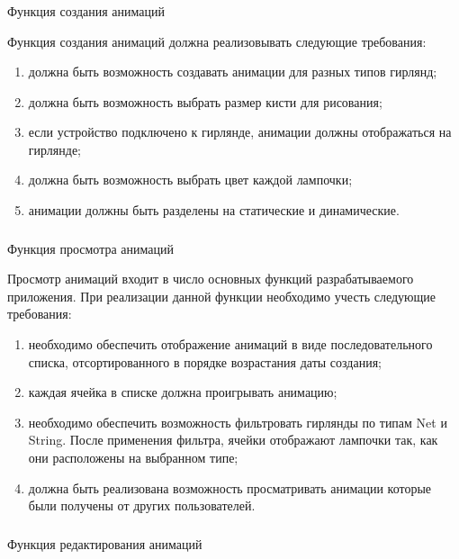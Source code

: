 \subsubsection{} Функция создания анимаций
\label{sec:domain:specification:messages}

Функция создания анимаций должна реализовывать следующие требования:

\begin{enumerate}
	\item должна быть возможность создавать анимации для разных типов гирлянд;
	\item должна быть возможность выбрать размер кисти для рисования;
	\item если устройство подключено к гирлянде, анимации должны отображаться на гирлянде;
	\item должна быть возможность выбрать цвет каждой лампочки;
	\item анимации должны быть разделены на статические и динамические.
\end{enumerate}

\subsubsection{} Функция просмотра анимаций
\label{sec:domain:specification:agenda}

Просмотр анимаций входит в число основных функций разрабатываемого приложения. При реализации данной функции необходимо учесть следующие требования:

\begin{enumerate}
	\item необходимо обеспечить отображение анимаций в виде последовательного списка, отсортированного в порядке возрастания даты создания;
	\item каждая ячейка в списке должна проигрывать анимацию;
	\item необходимо обеспечить возможность фильтровать гирлянды по типам Net и String. После применения фильтра, ячейки отображают лампочки так, как они расположены на выбранном типе;
    \item должна быть реализована возможность просматривать анимации которые были получены от других пользователей.
\end{enumerate}

\subsubsection{} Функция редактирования анимаций
\label{sec:domain:specification:subjects}

